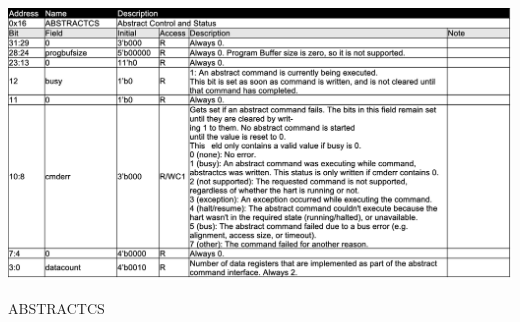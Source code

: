 \begin{table}[H]
    \includegraphics[width=1.00\columnwidth]{./Table/DM_ABSCMD_ABSTRACTCS.png}
    \caption{ABSTRACTCS}
    \label{tb:DM_ABSCMD_ABSTRACTCS}
\end{table}

